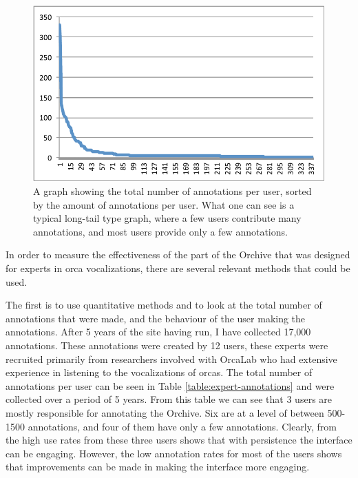 \documentclass[12pt,oneside]{book}
\begin{document}
\begin{figure}[h]
\centering
\includegraphics[width=\columnwidth]{figures/orcagameClassificationsPerUser}
\caption{A graph showing the total number of annotations per user,
  sorted by the amount of annotations per user.  What one can see is
  a typical long-tail type graph, where a few users contribute many
  annotations, and most users provide only a few annotations.}
\label{fig:OrcaGameClassificationsPerUser}
\end{figure}


\label{chap:expertinterfaceevaluation}

In order to measure the effectiveness of the part of the Orchive that
was designed for experts in orca vocalizations, there are several
relevant methods that could be used.

The first is to use quantitative methods and to look at the total
number of annotations that were made, and the behaviour of the user
making the annotations.  After 5 years of the site having run, I have
collected 17,000 annotations.  These annotations were created by 12
users, these experts were recruited primarily from researchers
involved with OrcaLab who had extensive experience in listening to the
vocalizations of orcas.  The total number of annotations per user can
be seen in Table \ref{table:expert-annotations} and were collected
over a period of 5 years.  From this table we can see that 3 users are
mostly responsible for annotating the Orchive.  Six are at a level of
between 500-1500 annotations, and four of them have only a few
annotations.  Clearly, from the high use rates from these three users
shows that with persistence the interface can be engaging.  However,
the low annotation rates for most of the users shows that improvements
can be made in making the interface more engaging.
\end{document}
